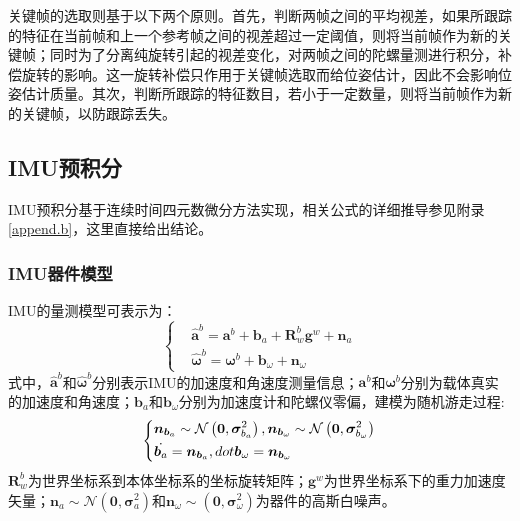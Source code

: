 关键帧的选取则基于以下两个原则。首先，判断两帧之间的平均视差，如果所跟踪的特征在当前帧和上一个参考帧之间的视差超过一定阈值，则将当前帧作为新的关键帧；同时为了分离纯旋转引起的视差变化，对两帧之间的陀螺量测进行积分，补偿旋转的影响。这一旋转补偿只作用于关键帧选取而给位姿估计，因此不会影响位姿估计质量。其次，判断所跟踪的特征数目，若小于一定数量，则将当前帧作为新的关键帧，以防跟踪丢失。
\subsection{IMU预积分}
IMU预积分基于连续时间四元数微分方法实现，相关公式的详细推导参见附录\ref{append.b}，这里直接给出结论。
\subsubsection{IMU器件模型}
IMU的量测模型可表示为：
\begin{equation}
\left\{
\begin{aligned}
&\hat{\bm{a}}^b=\bm{a}^b+\bm{b}_a+\bm{R}_w^b\bm{g}^w+\bm{n}_a\\
&\hat{\bm{\omega}}^b=\bm{\omega}^b+\bm{b}_\omega+\bm{n}_\omega
\end{aligned}
\right.
\end{equation}
式中，$\hat{\bm{a}}^b$和$\hat{\bm{\omega}}^b$分别表示IMU的加速度和角速度测量信息；$\bm{a}^b$和$\bm{\omega}^b$分别为载体真实的加速度和角速度；$\bm{b}_a$和$\bm{b}_\omega$分别为加速度计和陀螺仪零偏，建模为随机游走过程:
\begin{equation}
\centering
\left\{
\begin{aligned}
&\bm{n}_{\bm{b}_a}\sim\mathcal{N}\left(\bm{0},\bm{\sigma}_{b_a}^2\right),\bm{n}_{\bm{b}_\omega}\sim\mathcal{N}\left(\bm{0},\bm{\sigma}_{b_\omega}^2\right)\\
&\dot{\bm{b}_a}=\bm{n}_{\bm{b}_a},dot{\bm{b}_\omega}=\bm{n}_{\bm{b}_\omega}
\end{aligned}
\right.
\end{equation}
$\bm{R}_w^b$为世界坐标系到本体坐标系的坐标旋转矩阵；$\bm{g}^w$为世界坐标系下的重力加速度矢量；$\bm{n}_a\sim\mathcal{N}\left(\bm{0},\bm{\sigma}_a^2\right)$和$\bm{n}_\omega\sim\left(\bm{0},\bm{\sigma}_\omega^2\right)$为器件的高斯白噪声。
